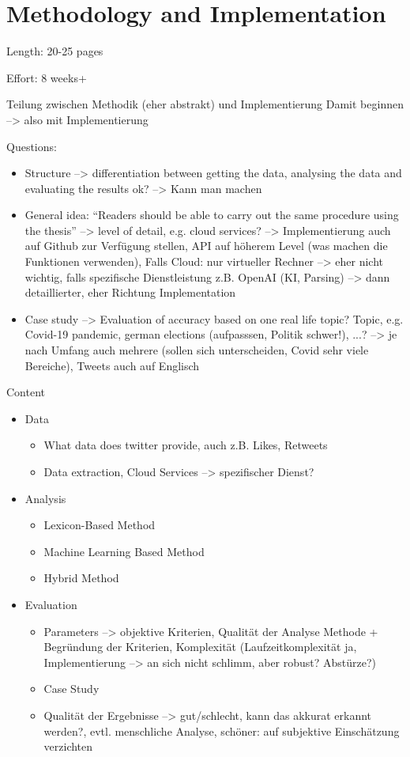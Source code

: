 \chapter{Methodology and Implementation}
\label{cha:Chapter4_Methodology}

Length: 20-25 pages

Effort: 8 weeks+

Teilung zwischen Methodik (eher abstrakt) und Implementierung
Damit beginnen --> also mit Implementierung

Questions:
\begin{itemize}
\item Structure --> differentiation between getting the data, analysing the data and evaluating the results ok? --> Kann man machen
\item General idea: ``Readers should be able to carry out the same procedure using the thesis'' --> level of detail, e.g. cloud services? --> Implementierung auch auf Github zur Verfügung stellen, API auf höherem Level (was machen die Funktionen verwenden),
Falls Cloud: nur virtueller Rechner --> eher nicht wichtig, falls spezifische Dienstleistung z.B. OpenAI (KI, Parsing) --> dann detaillierter, eher Richtung Implementation
\item Case study --> Evaluation of accuracy based on one real life topic? Topic, e.g. Covid-19 pandemic, german elections (aufpasssen, Politik schwer!), ...? --> je nach Umfang auch mehrere (sollen sich unterscheiden, Covid sehr viele Bereiche), Tweets auch auf Englisch
\end{itemize}

Content
\begin{itemize}
\item Data 
\begin{itemize}
    \item What data does twitter provide, auch z.B. Likes, Retweets
    \item Data extraction, Cloud Services --> spezifischer Dienst?
\end{itemize}
\item Analysis
\begin{itemize}
    \item Lexicon-Based Method
    \item Machine Learning Based Method
    \item Hybrid Method
\end{itemize}
\item Evaluation
\begin{itemize}
    \item Parameters --> objektive Kriterien, Qualität der Analyse Methode + Begründung der Kriterien, Komplexität (Laufzeitkomplexität ja, Implementierung --> an sich nicht schlimm, aber robust? Abstürze?)
    \item Case Study
    \item Qualität der Ergebnisse --> gut/schlecht, kann das akkurat erkannt werden?, evtl. menschliche Analyse, schöner: auf subjektive Einschätzung verzichten
\end{itemize}
\end{itemize}



